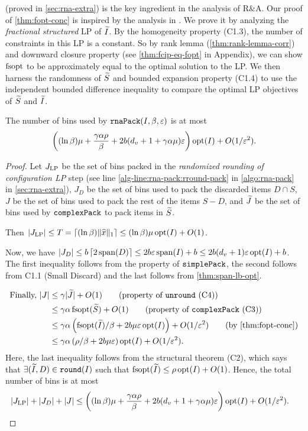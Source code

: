  (proved in \cref{sec:rna-extra})
is the key ingredient in the analysis of R\&A.
Our proof of \cref{thm:fopt-conc} is inspired by the analysis in \cite{khan-thesis}.
We prove it by analyzing the \emph{fractional structured} \config{} LP of $\widetilde{I}$.
By the homogeneity property (C1.3), the number of constraints in this LP is a constant.
So by rank lemma (\cref{thm:rank-lemma-corr}) and downward closure
property (see \cref{thm:fcip-eq-fopt} in Appendix), we can show
$\operatorname{fsopt}$ to be approximately equal to the optimal solution to the LP.
We then harness the randomness of $\widetilde{S}$ and bounded expansion
property (C1.4) to use the
independent bounded difference inequality \cite{mcdiarmid1989method}
to compare the optimal LP objectives of $\widetilde{S}$ and $\widetilde{I}$.

\begin{theorem}
\label{thm:rna-pack}
The number of bins used by $\operatorname{\mathtt{rnaPack}}(I, \beta, \varepsilon)$ is at most
\[ \left( (\ln\beta)\mu + \frac{\gamma\alpha\rho}{\beta}
    + 2b(d_v+1+\gamma\alpha\mu)\varepsilon \right) \operatorname{opt}(I) + O(1/\varepsilon^2). \]
\end{theorem}
\begin{proof}
Let $J_{\operatorname{LP}}$ be the set of bins packed in the {\em randomized rounding of
configuration LP} step
(see line \ref{alg-line:rna-pack:rround-pack} in \cref{algo:rna-pack}
in \cref{sec:rna-extra}),
$J_D$ be the set of bins used to pack the discarded items $D \cap S$,
$J$ be the set of bins used to pack the rest of the items $S - D$,
and $\widetilde{J}$ be the set of bins used by $\operatorname{\mathtt{complexPack}}$ to pack items in $\widetilde{S}$.

Then $|J_{\operatorname{LP}}| \le T = \lceil (\ln\beta)\lVert \widehat{x} \rVert_1 \rceil \le (\ln\beta)\mu\operatorname{opt}(I) + O(1)$.

Now, we have $|J_D| \le b\left\lceil 2\operatorname{span}(D) \right\rceil \le 2b\varepsilon\operatorname{span}(I) + b \le 2b(d_v+1)\varepsilon\operatorname{opt}(I) + b$.
The first inequality follows from the property of $\operatorname{\mathtt{simplePack}}$, the second follows from
C1.1 (Small Discard) and the last follows from \cref{thm:span-lb-opt}.

\begin{align*}
\text{Finally, } |J| &\le \gamma|\Jtild| + O(1)  \tag{property of $\unround$ (C4)}
\\ &\le \gamma\alpha\fsopt(\Stild) + O(1)  \tag{property of $\complexPack$ (C3)}
\\ &\le \gamma\alpha\left( {\fsopt(\Itild)}/{\beta} + 2b\mu\eps\opt(I) \right) + O(1/\eps^2)
    \tag{by \cref{thm:fopt-conc}}
\\ &\le \gamma\alpha\left(\rho/\beta + 2b\mu\eps\right)\opt(I) + O(1/\eps^2).
\end{align*}
Here, the last inequality follows from the structural theorem (C2),
which says that $\exists (\widetilde{I}, D) \in \operatorname{\mathtt{round}}(I)$ such that
$\operatorname{fsopt}(\widetilde{I}) \le \rho\operatorname{opt}(I) + O(1)$.
Hence, the total number of bins is at most
\begin{align*}
& |J_{\operatorname{LP}}| + |J_D| + |J|
\le \left( (\ln\beta)\mu + \frac{\gamma\alpha\rho}{\beta}
    + 2b(d_v+1+\gamma\alpha\mu)\varepsilon \right)\operatorname{opt}(I) + O(1/\varepsilon^2).
\qedhere \end{align*}
\end{proof}

